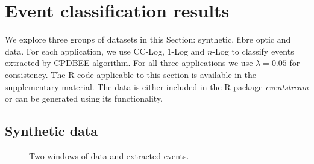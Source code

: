 \documentclass[a4paper,11pt]{article}
\begin{document}

\section{Event classification results}\label{sec:Experiments}

We explore three groups of datasets in this Section: synthetic, fibre optic  and  data. For each application, we use CC-Log, $1$-Log and $n$-Log to classify events extracted by CPDBEE algorithm. For all three applications we  use $\lambda= 0.05$ for consistency. The R code applicable to this section is available in the supplementary material. The data is either included in the R package \textit{eventstream} or can be generated using its functionality.

\subsection{Synthetic data}\label{subsec:ResultsSynthetic}

\begin{figure}
	\centering
	\caption{Two windows of data and extracted events.}
  \label{fig:TwoWindows}
\end{figure}
\end{document}
